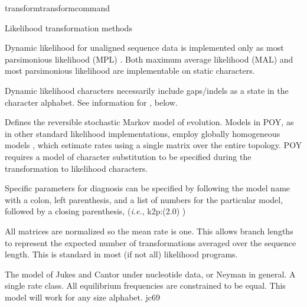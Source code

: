 \begin{command}{transform}{transformcommand}
\begin{arguments}
\begin{argumentgroup}{Likelihood transformation methods}
            \begin{statement}
                Dynamic likelihood for unaligned sequence data is
                implemented only as most parsimonious likelihood (MPL)
                \cite{barryandhartigan1987}. Both maximum average likelihood (MAL) and
                most parsimonious likelihood are implementable on static
                characters.
            \end{statement}

            \begin{statement}
                Dynamic likelihood characters necessarily include gaps/indels as
                a state in the character alphabet. See information for
                , below.
            \end{statement}

                {Defines the reversible stochastic Markov model of evolution.
                Models in POY, as in other standard likelihood implementations,
                employ globally homogeneous models \cite{jayaswal2005estimation}, which
                estimate rates using a single matrix over the entire topology.
                POY requires a model of character substitution to be specified
                during the transformation to likelihood characters.

                Specific parameters for diagnosis can be specified by following
                the model name with a colon, left parenthesis, and a list of
                numbers for the particular model, followed by a closing
                parenthesis, (\emph{i.e.}, k2p:(2.0) )

                \begin{statement}
                    All matrices are normalized so the mean rate is one. This
                    allows branch lengths to represent the expected number of
                    transformations averaged over the sequence length. This is
                    standard in most (if not all) likelihood programs.
                \end{statement}

                \begin{description}

                        {The model of Jukes and Cantor \cite{jukesandcantor1969}
                        under nucleotide data, or Neyman \cite{neyman1971} in general. A
                        single rate class. All equilibrium frequencies are
                        constrained to be equal. This model will work for any size
                        alphabet.}
                        {jc69}


\end{description}}
\end{argumentgroup}
\end{arguments}
\end{command}
